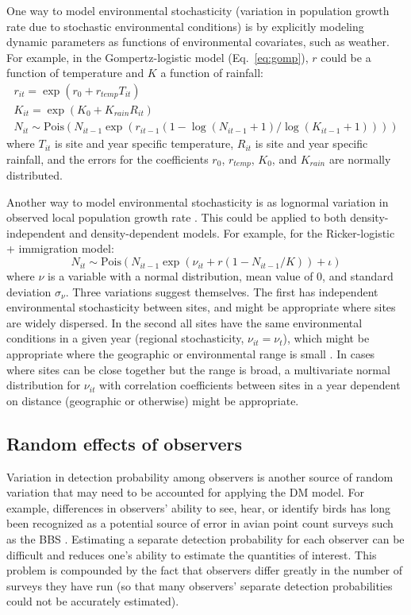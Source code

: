 \documentclass[12pt]{article}
\begin{document}
One way to model environmental stochasticity (variation in population growth
rate due to stochastic environmental conditions) is by explicitly
modeling dynamic parameters as functions of environmental covariates, such
as weather.  For example, in the Gompertz-logistic model (Eq.~\ref{eq:gomp}), $r$ could be a 
function of temperature and $K$ a function of rainfall:
\begin{gather}
r_{it} = \exp(r_{0} + r_{temp}T_{it}) \nonumber \\
K_{it} = \exp(K_{0} + K_{rain}R_{it})  \\
N_{it} \sim
\text{Pois}(N_{it-1}\exp(r_{it-1}(1-\log(N_{it-1}+1)/\log(K_{it-1}+1)))) \nonumber
\label{eq:weather}
\end{gather}
where $T_{it}$ is site and year specific temperature, $R_{it}$ is site and year specific rainfall,
and the errors for the coefficients $r_{0}$, $r_{temp}$, $K_{0}$, and $K_{rain}$ are 
normally distributed.

Another way to model environmental stochasticity is as lognormal variation in observed local population 
growth rate \citep{bjornstad:2001,bonsall_hastings:2004}.  This could be applied to both density-independent and density-dependent models.
For example, for the Ricker-logistic + immigration model:
\begin{equation}
N_{it} \sim
\text{Pois}(N_{it-1}\exp(\nu_{it} + r(1-N_{it-1}/K)) + \iota)
\label{eq:nuRand}
\end{equation}
where $\nu$ is a variable with a normal distribution, mean value of 0, and standard deviation $\sigma_\nu$.  
Three variations suggest themselves.  The first has independent environmental stochasticity 
between sites, and might be appropriate where sites are widely dispersed.  In the second 
all sites have the same environmental conditions in a given year (regional stochasticity, $\nu_{it} = \nu_{t}$),
which might be appropriate where the geographic or environmental range is small \citep{hanski:1998}.  
In cases where sites can be close together but the range is broad, a multivariate normal distribution for $\nu_{it}$ with correlation coefficients
between sites in a year dependent on distance (geographic or otherwise) might be appropriate.

\subsection{Random effects of observers}

Variation in detection probability among observers is another
source of random variation that may need to be accounted for applying
the DM model. For example, differences in observers' ability to see,
hear, or identify birds has long been recognized as a potential source of error
in avian point count surveys such as the BBS 
\citep{robbins_etal:1986,diefenbach_etal:2003,sauer_etal:1994auk,alldredge_etal:2007auk,campbell_francis:2011}.
Estimating a separate detection probability for each observer
can be difficult and reduces one's ability to estimate the quantities
of interest.  This problem is compounded by the fact that
observers differ greatly in the number of surveys they have
run (so that many observers' separate detection probabilities
could not be accurately estimated).
\end{document}
